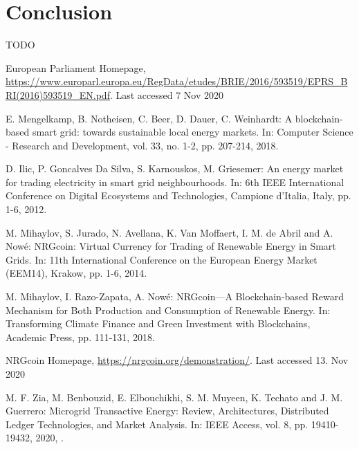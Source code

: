 \documentclass[runningheads]{llncs}
\begin{document}
\section{Conclusion}

TODO

%
%
%
% 
% 
%
\begin{thebibliography}{8}
European Parliament Homepage, \url{https://www.europarl.europa.eu/RegData/etudes/BRIE/2016/593519/EPRS\_BRI(2016)593519\_EN.pdf}. Last accessed 7 Nov 2020

E. Mengelkamp, B. Notheisen, C. Beer, D. Dauer, C. Weinhardt: A blockchain-based smart grid: towards sustainable local energy markets. In:  Computer Science - Research and Development, vol. 33, no. 1-2, pp. 207-214, 2018. 

D. Ilic, P. Goncalves Da Silva, S. Karnouskos, M. Griesemer: An energy market for trading electricity in smart grid neighbourhoods. In: 6th IEEE International Conference on Digital Ecosystems and Technologies, Campione d'Italia, Italy, pp. 1-6, 2012. 

M. Mihaylov, S. Jurado, N. Avellana, K. Van Moffaert, I. M. de Abril and A. Nowé: NRGcoin: Virtual Currency for Trading of Renewable Energy in Smart Grids. In: 11th International Conference on the European Energy Market (EEM14), Krakow, pp. 1-6, 2014. 

M. Mihaylov, I. Razo-Zapata, A. Nowé: NRGcoin—A Blockchain-based Reward Mechanism for Both Production and Consumption of Renewable Energy. In: Transforming Climate Finance and Green Investment with Blockchains, Academic Press, pp. 111-131, 2018.

NRGcoin Homepage, \url{https://nrgcoin.org/demonstration/}. Last accessed 13. Nov 2020

M. F. Zia, M. Benbouzid, E. Elbouchikhi, S. M. Muyeen, K. Techato and J. M. Guerrero:  Microgrid Transactive Energy: Review, Architectures, Distributed Ledger Technologies, and Market Analysis. In: IEEE Access, vol. 8, pp. 19410-19432, 2020, .


\end{thebibliography}
\end{document}
